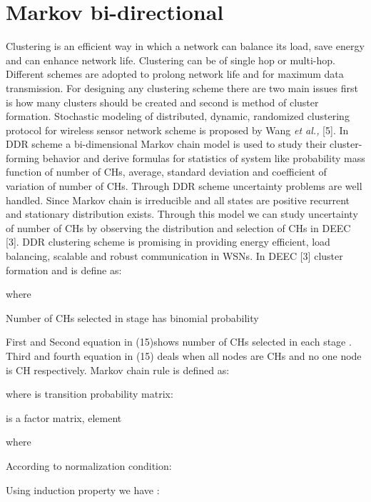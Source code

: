 \documentclass[10pt, conference, compsocconf]{IEEEtran}
\begin{document}
\section{Markov bi-directional}
Clustering is an efficient way in which a network can balance its load, save energy and can enhance network life. Clustering can be of single hop or multi-hop. Different schemes are adopted to prolong network life and for maximum data transmission. For designing any clustering scheme there are two main issues first is how many clusters should be created and second is method of cluster formation. Stochastic modeling of distributed, dynamic, randomized clustering protocol for wireless sensor network scheme is proposed by Wang \textit{et al.,} [5]. In DDR scheme a bi-dimensional Markov chain model is used to study their cluster-forming behavior and derive formulas for statistics of system like probability mass function of number of CHs, average, standard deviation and coefficient of variation of number of CHs. Through DDR scheme uncertainty problems are well handled. Since Markov chain is irreducible and all states are positive recurrent and stationary distribution exists. Through this model we can study uncertainty of number of CHs by observing the distribution and selection of CHs in DEEC [3]. DDR clustering scheme is promising in providing energy efficient, load balancing, scalable and robust communication in WSNs. In DEEC [3] cluster formation and is define as:



 where

 

Number of CHs selected in stage  has binomial probability

\small

\normalsize

First and Second equation in (15)shows number of CHs selected in each stage . Third and fourth equation in (15) deals when all nodes are CHs and no one node is CH respectively. Markov chain rule is defined as:



where  is transition probability matrix:



 is a factor matrix, element 


where



According to normalization condition:





Using induction property we have :
\end{document}
